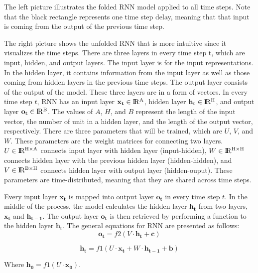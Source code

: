 The left picture illustrates the folded RNN model applied to all time steps. Note that the black rectangle represents one time step delay, meaning that that input is coming from the output of the previous time step. 

The right picture shows the unfolded RNN that is more intuitive since it visualizes the time steps. There are three layers in every time step t, which are input, hidden, and output layers. The input layer is for the input representations. In the hidden layer, it contains information from the input layer as well as those coming from hidden layers in the previous time steps. The output layer consists of the output of the model. These three layers are in a form of vectors. In every time step $t$, RNN has an input layer $ \mathbf{x_{t}} \in {\rm I\!R^{A}} $, hidden layer $ \mathbf{h_{t}} \in {\rm I\!R^{H}} $, and output layer $ \mathbf{o_{t}} \in {\rm I\!R^{B}} $. The values of $A$, $H$, and $B$ represent the length of the input vector, the number of unit in a hidden layer, and the length of the output vector, respectively. There are three parameters that will be trained, which are $U$, $V$, and $W.$ These parameters are the weight matrices for connecting two layers. $ U \in {\rm I\!R^{H \times A }}$ connects input layer with hidden layer (input-hidden), $ W \in {\rm I\!R^{H \times H}}$ connects hidden layer with the previous hidden layer (hidden-hidden), and $ V \in {\rm I\!R^{B \times H}}$ connects hidden layer with output layer (hidden-ouput). These parameters are time-distributed, meaning that they are shared across time steps. 

Every input layer $ \mathbf{x_{t}} $ is mapped into output layer $ \mathbf{o_{t}} $ in every time step $t$. In the middle of the process, the model calculates the hidden layer $ \mathbf{h_{t}} $ from two layers, $ \mathbf{x_{t}} $ and $ \mathbf{h_{t-1}} $. The output layer $ \mathbf{o_{t}} $ is then retrieved by performing a function to the hidden layer $\mathbf{h_{t}}$. The general equations for RNN are presented as follows:
\begin{equation}
\label{eq:rnnot}
\mathbf{o_{t}} = f2(V \cdot \mathbf{h_{t}} + \mathbf{c})
\end{equation}

\begin{equation}
\label{eq:rnnht}
\mathbf{h_{t}} = f1(U \cdot \mathbf{x_{t}} + W \cdot \mathbf{h_{t-1}} + \mathbf{b})
\end{equation}

Where $ \mathbf{h_{0}} = f1(U \cdot \mathbf{x_{0}}) $.


